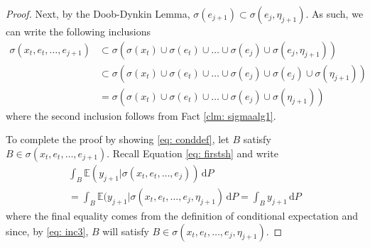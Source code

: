 \documentclass[12pt]{ectaart}
\newcommand{\1}{\mathbbm 1}
\theoremstyle{plain}
\theoremstyle{definition}
\begin{document}
\begin{proof}
	Next, by the Doob-Dynkin Lemma, $\sigma(e_{j+1})\subset \sigma(e_{j},\eta_{j+1})$. As such, we can write the following inclusions
	\begin{equation}\label{eq: inc3}
	\begin{aligned}
	\sigma(x_{t},e_{t},\dots,e_{j+1}) &\subset \sigma\left(\sigma(x_{t})\cup\sigma(e_{t})\cup\dots\cup \sigma(e_{j})\cup \sigma(e_{j},\eta_{j+1})\right)\\
	& \subset \sigma\left(\sigma(x_{t})\cup\sigma(e_{t})\cup\dots\cup \sigma(e_{j})\cup \sigma(e_{j})\cup\sigma(\eta_{j+1})\right)\\
	& = \sigma\left(\sigma(x_{t})\cup\sigma(e_{t})\cup\dots\cup \sigma(e_{j})\cup\sigma(\eta_{j+1})\right)
	\end{aligned}
	\end{equation}
	where the second inclusion follows from Fact \ref{clm: sigmaalg1}. 
	
	To complete the proof by showing \eqref{eq: conddef}, let $B$ satisfy $B\in \sigma(x_{t},e_{t},\dots,e_{j+1})$. Recall Equation \eqref{eq: firstsh} and write 
	\begin{multline*}
	\int_{B}\mathbb{E}(y_{j+1}\vert \sigma(x_{t},e_{t},\dots, e_{j}))\, \mathrm{d}P \\ = \int_{B}\mathbb{E}(y_{j+1}\vert \sigma(x_{t},e_{t},\dots, e_{j}, \eta_{j+1})\,\mathrm{d}P = \int_{B}y_{j+1}\,\mathrm{d}P
	\end{multline*}
	where the final equality comes from the definition of conditional expectation and since, by \eqref{eq: inc3}, $B$ will satisfy $B\in\sigma(x_{t},e_{t},\dots,e_{j},\eta_{j+1})$.
	
	\end{proof}
	
\end{document}
